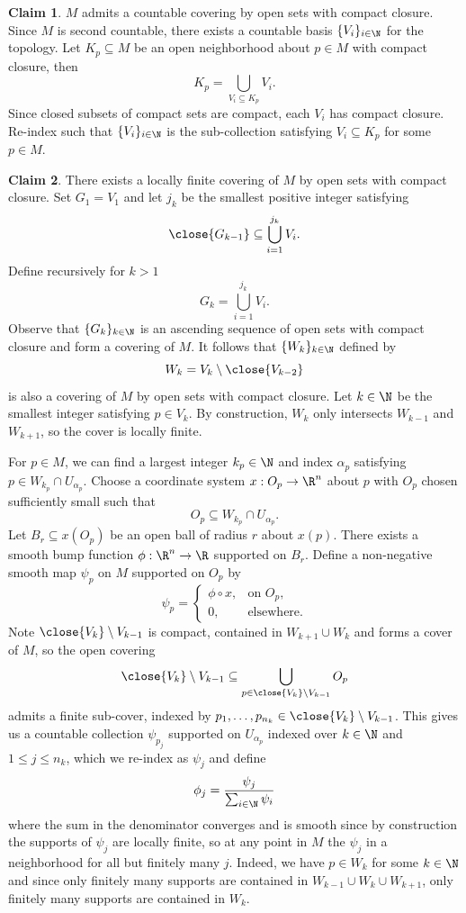 \documentclass[reqno]{amsart}
\theoremstyle{definition}
\newtheorem*{claim}{Claim}
\theoremstyle{remark}
\begin{document}
	\begin{claim}
		$M$ admits a countable covering by open sets with compact closure. Since $M$ is second countable, there exists a countable basis $\{ V_i \}_{i \in \N}$ for the topology. Let $K_p \subseteq M$ be an open neighborhood about $p \in M$ with compact closure, then 
			\[ K_p = \bigcup_{V_i \subseteq K_p} V_i. \]
		Since closed subsets of compact sets are compact, each $V_i$ has compact closure. Re-index such that $\{V_i\}_{i \in \N}$ is the sub-collection satisfying $V_i \subseteq K_p$ for some $p \in M$.
	\end{claim}
	
	\begin{claim}
		There exists a locally finite covering of $M$ by open sets with compact closure. Set $G_1 = V_1$ and let $j_k$ be the smallest positive integer satisfying
			\[ \close{G_{k - 1}} \subseteq \bigcup_{i = 1}^{j_k} V_i.  \]
		Define recursively for $k > 1$ 
			\[ G_k = \bigcup_{i = 1}^{j_k} V_i. \]
		Observe that $\{G_k\}_{k \in \N}$ is an ascending sequence of open sets with compact closure and form a covering of $M$. It follows that $\{ W_k \}_{k \in \N}$ defined by 
			\[ W_k = V_k \setminus \close{V_{k - 2}}\]
		is also a covering of $M$ by open sets with compact closure. Let $k \in \N$ be the smallest integer satisfying $p \in V_k$. By construction, $W_k$ only intersects $W_{k - 1}$ and $W_{k + 1}$, so the cover is locally finite. 
	\end{claim}
	For $p \in M$, we can find a largest integer $k_p \in \N$ and index $\alpha_p$ satisfying $p \in W_{k_p} \cap U_{\alpha_p}$. Choose a coordinate system $x: O_p \to \R^n$ about $p$ with $O_p$ chosen sufficiently small such that 
		\[ O_p \subseteq W_{k_p} \cap U_{\alpha_p}.\]
	Let $B_r \subseteq x(O_p)$ be an open ball of radius $r$ about $x(p)$. There exists a smooth bump function $\phi: \R^n \to \R$ supported on $B_r$. Define a non-negative smooth map $\psi_p$ on $M$ supported on $O_p$ by
		\[
			\psi_p = 
				\begin{cases}
					\phi \circ x, 	&\text{on $O_p$},\\
					0, 			&\text{elsewhere.}
				\end{cases}  
		\]
	Note $\close{V_k} \setminus V_{k -1}$ is compact, contained in $W_{k + 1} \cup W_k$ and forms a cover of $M$, so the open covering
		\[ \close{V_k} \setminus V_{k -1} \subseteq \bigcup_{p \in \close{V_k} \setminus V_{k - 1}} O_p \]
	admits a finite sub-cover, indexed by $p_1, \dots, p_{n_k} \in \close{V_k} \setminus V_{k -1}$. This gives us a countable collection $\psi_{p_j}$ supported on $U_{\alpha_p}$ indexed over $k \in \N$ and $1 \leq j \leq n_k$, which we re-index as $\psi_j$ and define
		\[ \phi_j = \frac{\psi_j}{\sum_{i \in \N} \psi_{i}} \]
	where the sum in the denominator converges and is smooth since by construction the supports of $\psi_j$ are locally finite, so at any point in $M$ the $\psi_j$ in a neighborhood for all but finitely many $j$. Indeed, we have $p \in W_k$ for some $k \in \N$ and since only finitely many supports are contained in $W_{k - 1} \cup W_k \cup W_{k + 1}$, only finitely many supports are contained in $W_k$. 
	
\end{document}
